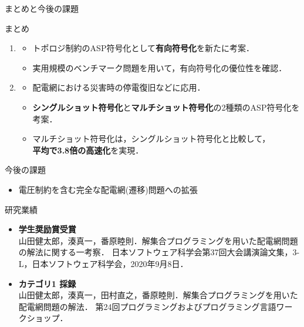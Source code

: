 \documentclass[dvipdfmx,11pt]{beamer}
\begin{document}
\begin{frame}{まとめと今後の課題}
 \begin{block}{まとめ}
 \begin{enumerate}
   \item {}
   \begin{itemize}
    \item トポロジ制約のASP符号化として\textbf{有向符号化}を新たに考案．
    \item 実用規模のベンチマーク問題を用いて，有向符号化の優位性を確認．
   \end{itemize}
   \item {}
   \begin{itemize}
    \item 配電網における災害時の停電復旧などに応用．
    \item \textbf{シングルショット符号化}と\textbf{マルチショット符号化}の2種類のASP符号化を考案．
    \item マルチショット符号化は，シングルショット符号化と比較して，\\ 
          \textbf{平均で3.8倍の高速化}を実現．
   \end{itemize}
 \end{enumerate}
 \end{block}
 \vfill
 \begin{alertblock}{今後の課題}
  \begin{itemize}
   \item 電圧制約を含む完全な配電網(遷移)問題への拡張
  \end{itemize}
 \end{alertblock}
\end{frame}
\begin{frame}{研究業績}
 \begin{itemize}
  \small
  \item \alert{\bf 学生奨励賞受賞}\\
        山田健太郎，湊真一，番原睦則．解集合プログラミングを用いた配電網問題の解法に関する一考察．
        日本ソフトウェア科学会第37回大会講演論文集，3-L，日本ソフトウェア科学会，2020年9月8日．
  \item \alert{\bf カテゴリ1 採録}\\
        山田健太郎，湊真一，田村直之，番原睦則．解集合プログラミングを用いた配電網問題の解法．
        第24回プログラミングおよびプログラミング言語ワークショップ．
 \end{itemize}
\end{frame}

%
\end{document}
